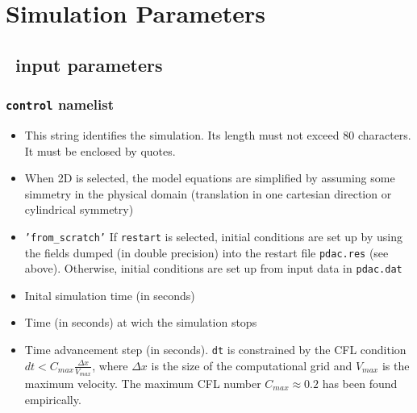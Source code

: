 \section{Simulation Parameters}
\label{section:basic}


\subsection{\PDAC\ input parameters}
\label{section:config_basic}

\subsubsection{{\tt control} namelist}

\begin{itemize}
\item
{}
{This string identifies the simulation. Its length must not exceed 80 characters. It must be enclosed by quotes.}

\item
{}
{When 2D is selected, the model equations are simplified by assuming
some simmetry in the physical domain (translation in one cartesian 
direction or cylindrical symmetry)}

\item
{}
{{\tt 'from\_scratch'}}
{If {\tt restart} is selected, initial conditions are set up by using the fields
dumped (in double precision) into the restart file {\tt pdac.res} (see above). 
Otherwise, initial conditions are set up from input data in {\tt pdac.dat}} 

\item
{}
{Inital simulation time (in seconds)}

\item
{}
{Time (in seconds) at wich the simulation stops}

\item
{}
{Time advancement step (in seconds). 
{\tt dt} is constrained by the CFL condition
$dt < C_{max}\frac{\Delta x}{V_{max}}$, where $\Delta x$ is
the size of the computational grid and $V_{max}$ is the maximum
velocity. The maximum CFL number $C_{max}\approx 0.2$ has been 
found empirically.}


\end{itemize}
